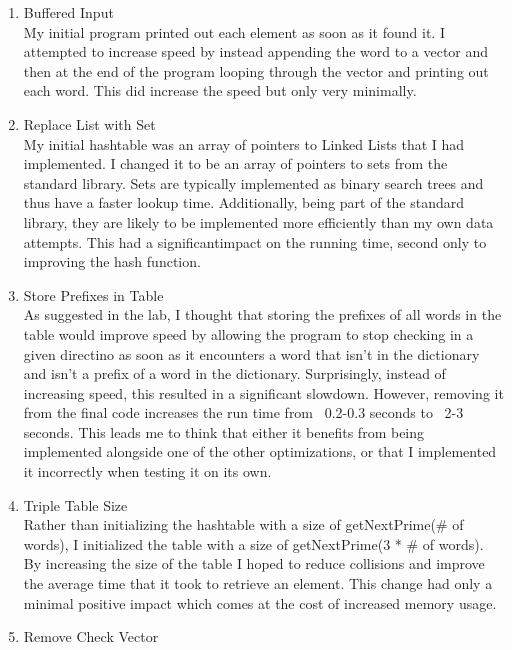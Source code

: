 \documentclass{article}
\begin{document}
\begin{enumerate}
    \item Buffered Input\\
        My initial program printed out each element as soon as it found it. I attempted to increase speed by instead appending the word to a vector and then at the end of the program looping through the vector and printing out each word. This did increase the speed but only very minimally.
    \item Replace List with Set\\
        My initial hashtable was an array of pointers to Linked Lists that I had implemented. I changed it to be an array of pointers to sets from the standard library. Sets are typically implemented as binary search trees and thus have a faster lookup time. Additionally, being part of the standard library, they are likely to be implemented more efficiently than my own data attempts. This had a significantimpact on the running time, second only to improving the hash function.
    \item Store Prefixes in Table\\
        As suggested in the lab, I thought that storing the prefixes of all words in the table would improve speed by allowing the program to stop checking in a given directino as soon as it encounters a word that isn't in the dictionary and isn't a prefix of a word in the dictionary. Surprisingly, instead of increasing speed, this resulted in a significant slowdown. However, removing it from the final code increases the run time from ~0.2-0.3 seconds to ~2-3 seconds. This leads me to think that either it benefits from being implemented alongside one of the other optimizations, or that I implemented it incorrectly when testing it on its own.
    \item Triple Table Size\\
        Rather than initializing the hashtable with a size of getNextPrime(\# of words), I initialized the table with a size of getNextPrime(3 * \# of words). By increasing the size of the table I hoped to reduce collisions and improve the average time that it took to retrieve an element. This change had only a minimal positive impact which comes at the cost of increased memory usage.
    \item Remove Check Vector\\

\end{enumerate}
\end{document}
